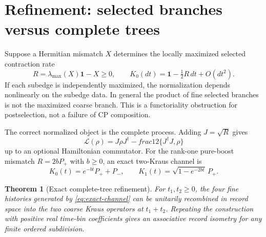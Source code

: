 \documentclass[11pt]{article}
\newtheorem{theorem}{Theorem}[section]
\theoremstyle{remark}
\newcommand{\id}{\mathbf 1}
\newcommand{\cL}{\mathcal L}
\begin{document}
\section{Refinement: selected branches versus complete trees}
\label{sec:refinement}

Suppose a Hermitian mismatch $X$ determines the locally maximized selected contraction
rate
\begin{equation}
 R=\lambda_{\max}(X)\id-X\geq0,\qquad
 K_0(dt)=\id-\tfrac12R\,dt+O(dt^2).
 \label{eq:selected-rate}
\end{equation}
If each subedge is independently maximized, the normalization depends nonlinearly on the
subedge data.  In general the product of fine selected branches is not the maximized coarse
branch.  This is a functoriality obstruction for postselection, not a failure of CP
composition.

The correct normalized object is the complete process.  Adding $J=\sqrt R$ gives
\begin{equation}
 \cL(\rho)=J\rho J^\dagger-	frac12\{J^\dagger J,\rho\}
 \label{eq:gksl-generator}
\end{equation}
up to an optional Hamiltonian commutator.  For the rank-one pure-boost mismatch
$R=2bP_+$ with $b\geq0$, an exact two-Kraus channel is
\begin{equation}
 K_0(t)=e^{-bt}P_++P_-,\qquad
 K_1(t)=\sqrt{1-e^{-2bt}}\,P_+.
 \label{eq:exact-channel}
\end{equation}

\begin{theorem}[Exact complete-tree refinement]
\label{thm:tree-refinement}
For $t_1,t_2\geq0$, the four fine histories generated by
\eqref{eq:exact-channel} can be unitarily recombined in record space into the two coarse
Kraus operators at $t_1+t_2$.  Repeating the construction with positive real time-bin
coefficients gives an associative record isometry for any finite ordered subdivision.
\end{theorem}
\end{document}
